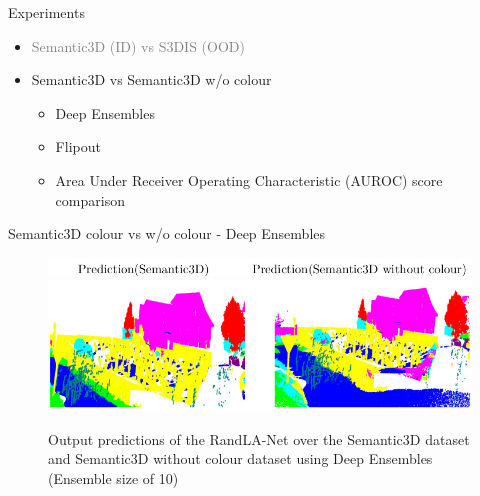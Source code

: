 \documentclass[aspectratio=169]{beamer}
\begin{document}
\begin{frame}[noframenumbering]{Experiments}
    \begin{itemize}
        \item \textcolor{gray}{Semantic3D (ID) vs S3DIS (OOD)}
        
        \item Semantic3D vs Semantic3D w/o colour
        \begin{itemize}
            \item Deep Ensembles
            \item Flipout
            \item Area Under Receiver Operating Characteristic (AUROC) score comparison
        \end{itemize}
    \end{itemize}
\end{frame}
\begin{frame}{Semantic3D colour vs w/o colour - Deep Ensembles}
    \begin{figure}
        \centering
        \includegraphics[scale=0.5]{images/ood2/top_legend_ood2.jpg}
        \includegraphics[scale=0.5]{images/ood2/Sem3d_OOD2_DE.jpg}
        \caption{Output predictions of the RandLA-Net over the Semantic3D dataset and Semantic3D without
        colour dataset using Deep Ensembles (Ensemble size of 10)}
        \label{fig:DE_ood2_op}
    \end{figure}
\end{frame}
\end{document}
